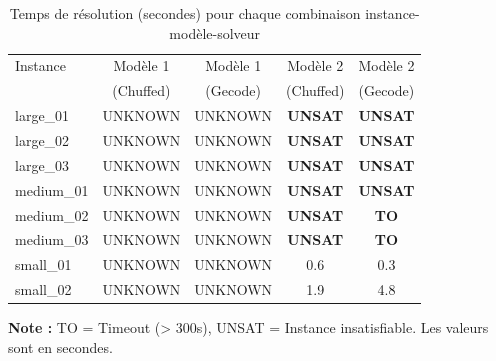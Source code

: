 \begin{table}[h]
\centering
\caption{Temps de résolution (secondes) pour chaque combinaison instance-modèle-solveur}
\label{tab:resultats_temps}
\begin{tabular}{lcccc}
\toprule
Instance & Modèle 1 & Modèle 1 & Modèle 2 & Modèle 2 \\
         & (Chuffed) & (Gecode) & (Chuffed) & (Gecode) \\
\midrule
large\_01 & UNKNOWN & UNKNOWN & \textbf{UNSAT} & \textbf{UNSAT} \\
large\_02 & UNKNOWN & UNKNOWN & \textbf{UNSAT} & \textbf{UNSAT} \\
large\_03 & UNKNOWN & UNKNOWN & \textbf{UNSAT} & \textbf{UNSAT} \\
medium\_01 & UNKNOWN & UNKNOWN & \textbf{UNSAT} & \textbf{UNSAT} \\
medium\_02 & UNKNOWN & UNKNOWN & \textbf{UNSAT} & \textbf{TO} \\
medium\_03 & UNKNOWN & UNKNOWN & \textbf{UNSAT} & \textbf{TO} \\
small\_01 & UNKNOWN & UNKNOWN & 0.6 & 0.3 \\
small\_02 & UNKNOWN & UNKNOWN & 1.9 & 4.8 \\
\bottomrule
\end{tabular}
\end{table}

\textbf{Note :} TO = Timeout (> 300s), UNSAT = Instance insatisfiable. Les valeurs sont en secondes.